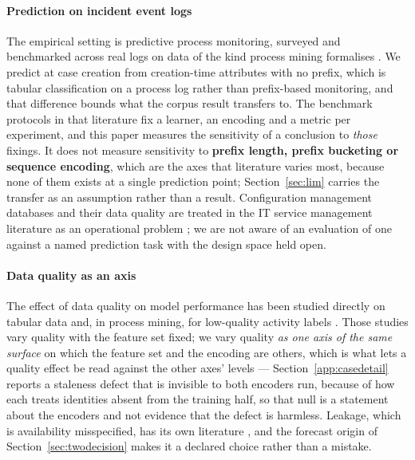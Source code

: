 \paragraph{Prediction on incident event logs}
The empirical setting is predictive process monitoring, surveyed and
benchmarked across real logs
\citep{teinemaa2019outcome,verenich2019survey} on data of the kind process
mining formalises \citep{vanderaalst2016process}. We predict at case creation
from creation-time attributes with no prefix, which is tabular classification
on a process log rather than prefix-based monitoring, and that difference
bounds what the corpus result transfers to. The benchmark protocols in that
literature fix a learner, an encoding and a metric per experiment, and this
paper measures the sensitivity of a conclusion to \emph{those} fixings. It
does not measure sensitivity to \textbf{prefix length, prefix bucketing or
sequence encoding}, which are the axes that literature varies most, because
none of them exists at a single prediction point; Section~\ref{sec:lim}
carries the transfer as an assumption rather than a result. Configuration
management databases and their data quality are treated in the IT service
management literature as an operational problem \citep{marrone2011itil}; we
are not aware of an evaluation of one against a named prediction task with the
design space held open.

\paragraph{Data quality as an axis}
The effect of data quality on model performance has been studied directly on
tabular data \citep{mohammed2025dataquality} and, in process mining, for
low-quality activity labels \citep{comuzzi2025labels}. Those studies vary
quality with the feature set fixed; we vary quality \emph{as one axis of the
same surface} on which the feature set and the encoding are others, which is
what lets a quality effect be read against the other axes' levels ---
Section~\ref{app:casedetail} reports a staleness defect that is invisible to
both encoders run, because of how each treats identities absent from the
training half, so that null is a statement about the encoders and not
evidence that the defect is harmless. Leakage, which is availability
misspecified, has its own literature
\citep{kaufman2012leakage,kapoor2023leakage,weytjens2022leakage}, and the
forecast origin of Section~\ref{sec:twodecision} makes it a declared choice
rather than a mistake.

